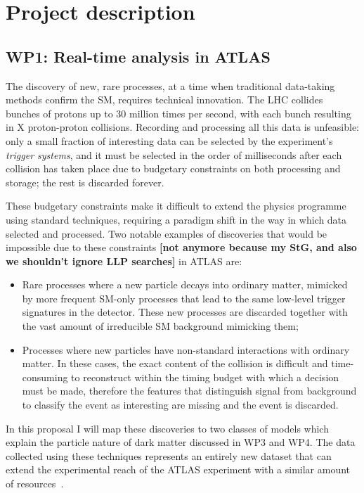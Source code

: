\documentclass[11pt,a4paper]{article}
\begin{document}
\section{Project description}
\smallskip

\subsection*{WP1: Real-time analysis in ATLAS}

The discovery of new, rare processes, at a time when traditional data-taking methods confirm the SM, requires technical innovation. The LHC collides bunches of protons up to 30 million times per second, with each bunch resulting in X proton-proton collisions. Recording and processing all this data is unfeasible: only a small fraction of interesting data can be selected by the experiment’s \textit{trigger systems}, and it must be selected in the order of milliseconds after each collision has taken place due to budgetary constraints on both processing and storage; the rest is discarded forever.

These budgetary constraints make it difficult to extend the physics programme using standard techniques, requiring a paradigm shift in the way in which data selected and processed.
Two notable examples of discoveries that would be impossible due to these constraints \textbf{[not anymore because my StG, and also we shouldn’t ignore LLP searches]} in ATLAS are:
\begin{itemize} 
\item Rare processes where a new particle decays into ordinary matter, mimicked by more frequent SM-only processes that lead to the same low-level trigger signatures in the detector. These new processes are discarded together with the vast amount of irreducible SM background mimicking them;
\item Processes where new particles have non-standard interactions with ordinary matter. In these cases, the exact content of the collision is difficult and time-consuming to reconstruct within the timing budget with which a decision must be made, therefore the features that distinguish signal from background to classify the event as interesting are missing and the event is discarded.
\end{itemize}
In this proposal I will map these discoveries to two classes of models which explain the particle nature of dark matter discussed in WP3 and WP4. The data collected using these techniques represents an entirely new dataset that can extend the experimental reach of the ATLAS experiment with a similar amount of resources~\cite{Resonances}. 
\end{document}
